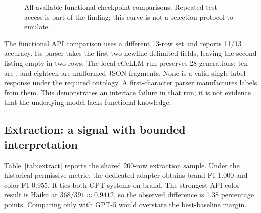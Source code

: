 \begin{figure}[t]
\centering
{}
\caption{All available functional checkpoint comparisons. Repeated test access is part of the finding; this curve is not a selection protocol to emulate.}
\label{fig:selection}
\end{figure}

The functional API comparison uses a different 13-row set and reports 11/13 accuracy. Its parser takes the first two newline-delimited fields, leaving the second listing empty in two rows. The local eCeLLM run preserves 28 generations: ten are , and eighteen are malformed JSON fragments. None is a valid single-label response under the required ontology. A first-character parser manufactures labels from them. This demonstrates an interface failure in that run; it is not evidence that the underlying model lacks functional knowledge.

\subsection{Extraction: a signal with bounded interpretation}
Table~\ref{tab:extract} reports the shared 200-row extraction sample. Under the historical permissive metric, the dedicated adapter obtains brand F1 1.000 and color F1 0.955. It ties both GPT systems on brand. The strongest API color result is Haiku at $368/391\approx0.9412$, so the observed difference is 1.38 percentage points. Comparing only with GPT-5 would overstate the best-baseline margin.

